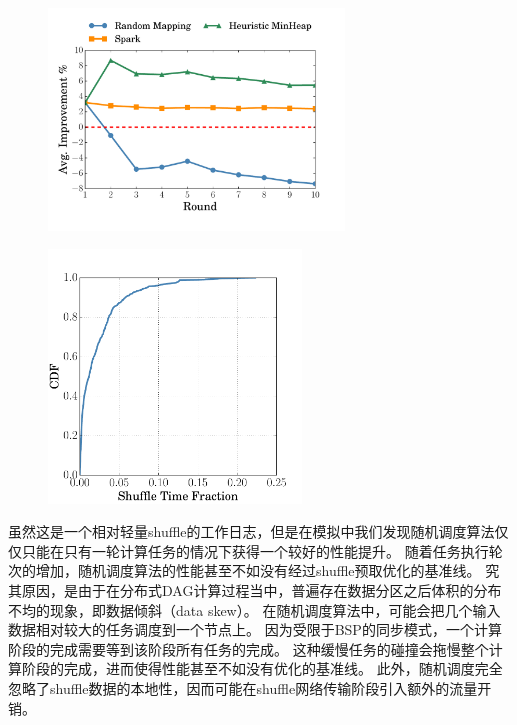 \begin{figure}[!htp]
    \centering
	\includegraphics[width=0.7\textwidth]{../../PPoPP-2018/fig/sim.pdf}
\end{figure}

\begin{figure}[!htp]
    \centering
	\includegraphics[width=0.6\textwidth]{../../PPoPP-2018/fig/reduce_cdf.pdf}
\end{figure}

虽然这是一个相对轻量shuffle的工作日志，但是在模拟中我们发现随机调度算法仅仅只能在只有一轮计算任务的情况下获得一个较好的性能提升。
随着任务执行轮次的增加，随机调度算法的性能甚至不如没有经过shuffle预取优化的基准线。
究其原因，是由于在分布式DAG计算过程当中，普遍存在数据分区之后体积的分布不均的现象，即数据倾斜（data skew）\cite{reining, gufler2012load, skewtune}。
在随机调度算法中，可能会把几个输入数据相对较大的任务调度到一个节点上。
因为受限于BSP的同步模式，一个计算阶段的完成需要等到该阶段所有任务的完成。
这种缓慢任务的碰撞会拖慢整个计算阶段的完成，进而使得性能甚至不如没有优化的基准线。
此外，随机调度完全忽略了shuffle数据的本地性，因而可能在shuffle网络传输阶段引入额外的流量开销。

